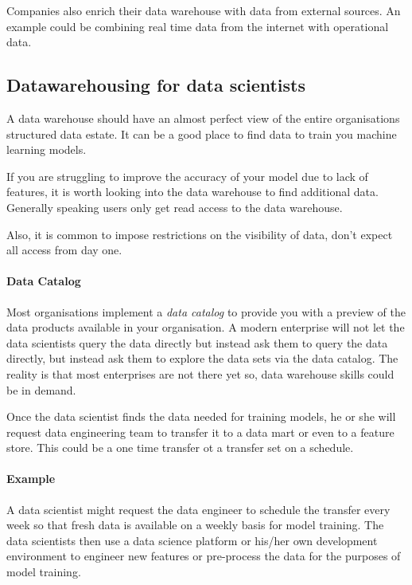 Companies also enrich their data warehouse with data from external sources.
An example could be combining real time data from the internet with operational data.

\subsection{Datawarehousing for data scientists}

A data warehouse should have an almost perfect view of the entire organisations structured data estate.
It can be a good place to find data to train you machine learning models.
\begin{note}
    If you are struggling to improve the accuracy of your model due to lack of features, it is worth looking into the data warehouse to find additional data.
    Generally speaking users only get read access to the data warehouse.
\end{note}
Also, it is common to impose restrictions on the visibility of data, don't expect all access from day one.

\paragraph{Data Catalog}
Most organisations implement a \textit{data catalog} to provide you with a preview of the data products available in your organisation.
A modern enterprise will not let the data scientists query the data directly but instead ask them to query the data directly, but instead ask them to explore the data sets via the data catalog.
The reality is that most enterprises are not there yet so, data warehouse skills could be in demand.

Once the data scientist finds the data needed for training models, he or she will request data engineering team to transfer it to a data mart or even to a feature store.
This could be a one time transfer ot a transfer set on a schedule.

\paragraph{Example}
A data scientist might request the data engineer to schedule the transfer every week so that fresh data is available on a weekly basis for model training.
The data scientists then use a data science platform or his/her own development environment to engineer new features or pre-process the data for the purposes of model training.

